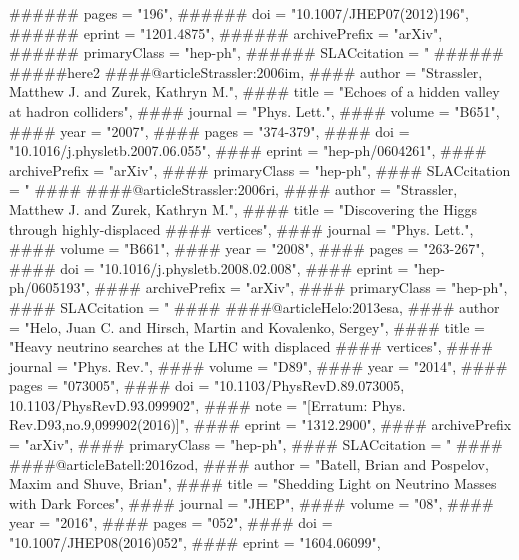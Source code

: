 {{######      pages          = "196",
######      doi            = "10.1007/JHEP07(2012)196",
######      eprint         = "1201.4875",
######      archivePrefix  = "arXiv",
######      primaryClass   = "hep-ph",
######      SLACcitation   = "%
######}
#####here2
####@article{Strassler:2006im,
####      author         = "Strassler, Matthew J. and Zurek, Kathryn M.",
####      title          = "{Echoes of a hidden valley at hadron colliders}",
####      journal        = "Phys. Lett.",
####      volume         = "B651",
####      year           = "2007",
####      pages          = "374-379",
####      doi            = "10.1016/j.physletb.2007.06.055",
####      eprint         = "hep-ph/0604261",
####      archivePrefix  = "arXiv",
####      primaryClass   = "hep-ph",
####      SLACcitation   = "%
####}
####@article{Strassler:2006ri,
####      author         = "Strassler, Matthew J. and Zurek, Kathryn M.",
####      title          = "{Discovering the Higgs through highly-displaced
####                        vertices}",
####      journal        = "Phys. Lett.",
####      volume         = "B661",
####      year           = "2008",
####      pages          = "263-267",
####      doi            = "10.1016/j.physletb.2008.02.008",
####      eprint         = "hep-ph/0605193",
####      archivePrefix  = "arXiv",
####      primaryClass   = "hep-ph",
####      SLACcitation   = "%
####}
####@article{Helo:2013esa,
####      author         = "Helo, Juan C. and Hirsch, Martin and Kovalenko, Sergey",
####      title          = "{Heavy neutrino searches at the LHC with displaced
####                        vertices}",
####      journal        = "Phys. Rev.",
####      volume         = "D89",
####      year           = "2014",
####      pages          = "073005",
####      doi            = "10.1103/PhysRevD.89.073005, 10.1103/PhysRevD.93.099902",
####      note           = "[Erratum: Phys. Rev.D93,no.9,099902(2016)]",
####      eprint         = "1312.2900",
####      archivePrefix  = "arXiv",
####      primaryClass   = "hep-ph",
####      SLACcitation   = "%
####}
####@article{Batell:2016zod,
####      author         = "Batell, Brian and Pospelov, Maxim and Shuve, Brian",
####      title          = "{Shedding Light on Neutrino Masses with Dark Forces}",
####      journal        = "JHEP",
####      volume         = "08",
####      year           = "2016",
####      pages          = "052",
####      doi            = "10.1007/JHEP08(2016)052",
####      eprint         = "1604.06099",
}}
